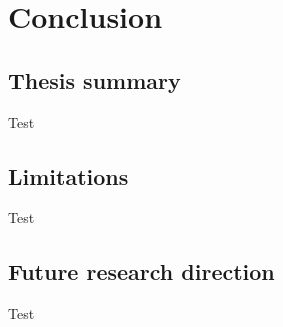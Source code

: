 \chapter{Conclusion}
\label{chapter:conclusion}
\ifpdf
    \graphicspath{{Chapter3/Figs/Raster/}{Chapter3/Figs/PDF/}{Chapter3/Figs/}}
\else
    \graphicspath{{Chapter3/Figs/Vector/}{Chapter3/Figs/}}
\fi


\section{Thesis summary}

Test

\section{Limitations}

Test

\section{Future research direction}

Test